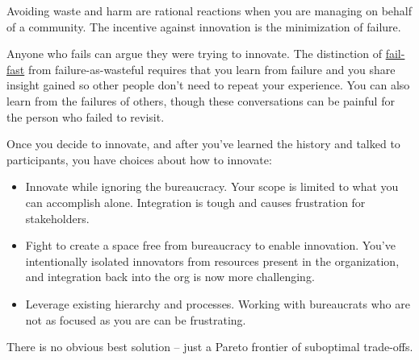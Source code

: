 Avoiding waste and harm are rational reactions when you are managing \iftoggle{glossarysubstitutionworks}{\glspl{shared resource}}{shared resources} on behalf 
of a community. The incentive against innovation is the minimization of failure.

Anyone who fails can argue they were trying to innovate. The distinction of \href{https://en.wikipedia.org/wiki/Fail-fast\%23Business}{fail-fast}\iftoggle{WPinmargin}{\marginpar{$>$Wikipedia: Fail-fast}}{}%
 from failure-as-wasteful requires that you learn from failure and you share insight gained so other people don't need to repeat your experience. You can also learn from the failures of others, though these conversations can be painful for the person who failed to revisit.


Once you decide to innovate, and after you've learned the history and talked to participants, you have choices about how to innovate:
\begin{itemize}
\item Innovate while ignoring the bureaucracy. Your scope is limited to what you can accomplish alone. Integration is tough and causes frustration for stakeholders.
\item Fight to create a space free from bureaucracy to enable innovation. You've intentionally isolated innovators from resources present in the organization, and integration back into the org is now more challenging. 
\item Leverage existing hierarchy and processes. Working with bureaucrats who are not as focused as you are can be frustrating.
\end{itemize}

There is no obvious best solution -- just a Pareto frontier of suboptimal trade-offs.

